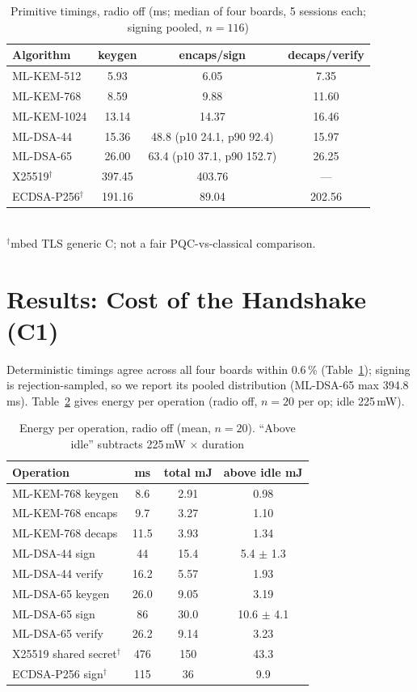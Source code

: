 \documentclass[conference]{IEEEtran}
\begin{document}
\begin{table}[t]
\caption{Primitive timings, radio off (ms; median of four boards, 5 sessions each; signing pooled, $n=116$)}
\label{tab:e1}
\centering\small
\setlength{\tabcolsep}{2.5pt}
\begin{tabular}{lccc}
\toprule
Algorithm & keygen & encaps/sign & decaps/verify\\
\midrule
ML-KEM-512 & 5.93 & 6.05 & 7.35\\
ML-KEM-768 & 8.59 & 9.88 & 11.60\\
ML-KEM-1024 & 13.14 & 14.37 & 16.46\\
ML-DSA-44 & 15.36 & 48.8 (p10 24.1, p90 92.4) & 15.97\\
ML-DSA-65 & 26.00 & 63.4 (p10 37.1, p90 152.7) & 26.25\\
X25519$^\dagger$ & 397.45 & 403.76 & ---\\
ECDSA-P256$^\dagger$ & 191.16 & 89.04 & 202.56\\
\bottomrule
\end{tabular}\\[2pt]
{\footnotesize $^\dagger$mbed TLS generic C; not a fair PQC-vs-classical comparison.}
\end{table}

\section{Results: Cost of the Handshake (C1)}\label{sec:cost}
Deterministic timings agree across all four boards within 0.6\,\% (Table~\ref{tab:e1}); signing is rejection-sampled,
so we report its pooled distribution (ML-DSA-65 max 394.8\,ms). Table~\ref{tab:e2} gives energy per operation
(radio off, $n=20$ per op; idle 225\,mW).

\begin{table}[t]
\caption{Energy per operation, radio off (mean, $n=20$). ``Above idle'' subtracts 225\,mW $\times$ duration}
\label{tab:e2}
\centering\small
\begin{tabular}{lccc}
\toprule
Operation & ms & total mJ & above idle mJ\\
\midrule
ML-KEM-768 keygen & 8.6 & 2.91 & 0.98\\
ML-KEM-768 encaps & 9.7 & 3.27 & 1.10\\
ML-KEM-768 decaps & 11.5 & 3.93 & 1.34\\
ML-DSA-44 sign & 44 & 15.4 & 5.4 $\pm$ 1.3\\
ML-DSA-44 verify & 16.2 & 5.57 & 1.93\\
ML-DSA-65 keygen & 26.0 & 9.05 & 3.19\\
ML-DSA-65 sign & 86 & 30.0 & 10.6 $\pm$ 4.1\\
ML-DSA-65 verify & 26.2 & 9.14 & 3.23\\
X25519 shared secret$^\dagger$ & 476 & 150 & 43.3\\
ECDSA-P256 sign$^\dagger$ & 115 & 36 & 9.9\\
\bottomrule
\end{tabular}
\end{table}
\end{document}
